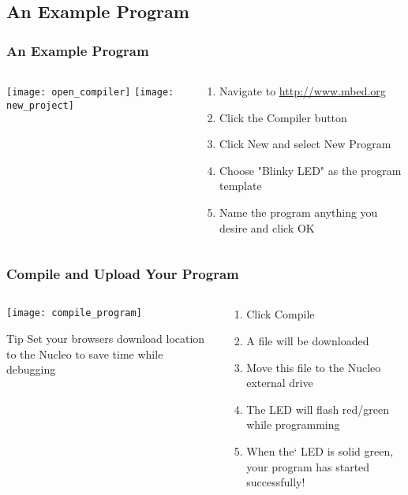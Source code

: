 \subsection{An Example Program}
\begin{frame}
	\frametitle{An Example Program}
	\begin{columns}[T]
		\begin{column}{0.5\textwidth}
			\texttt{[image: open\_compiler]}
			\vspace{1ex}
			\texttt{[image: new\_project]}
		\end{column}
		\begin{column}{0.5\textwidth}
			\begin{enumerate}
				\item Navigate to \url{http://www.mbed.org}
				\item Click the Compiler button
				\item Click New and select New Program
				\item Choose "Blinky LED" as the program template
				\item Name the program anything you desire and click OK
			\end{enumerate}
		\end{column}
	\end{columns}
\end{frame}

\begin{frame}
	\frametitle{Compile and Upload Your Program}
	\begin{columns}[T]
		\begin{column}{0.5\textwidth}
			\texttt{[image: compile\_program]}
			\begin{block}{Tip}
				Set your browsers download location to the Nucleo to save time while debugging
			\end{block}
		\end{column}
		\begin{column}{0.5\textwidth}
			\begin{enumerate}
				\item Click Compile
				\item A file will be downloaded
				\item Move this file to the Nucleo external drive
				\item The LED will flash red/green while programming
				\item When the` LED is solid green, your program has started successfully!
			\end{enumerate}
		\end{column}
	\end{columns}
\end{frame}

